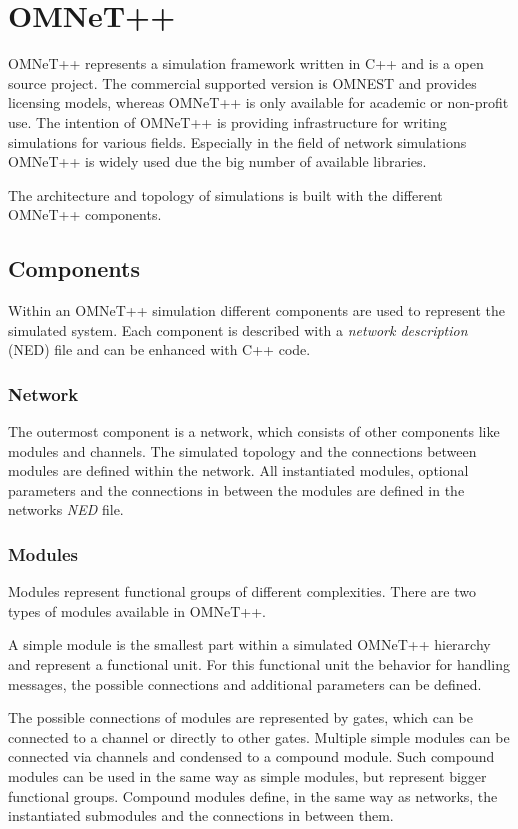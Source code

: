 \chapter{OMNeT++}

\label{sec:OMNeT}
OMNeT++ represents a simulation framework written in C++ and is a open source project.
The commercial supported version is OMNEST and provides licensing models, whereas OMNeT++ is only available for academic or non-profit use.
The intention of OMNeT++ is providing infrastructure for writing simulations for various fields.
Especially in the field of network simulations OMNeT++ is widely used due the big number of available libraries.

The architecture and topology of simulations is built with the different OMNeT++ components.

\section{Components}
Within an OMNeT++ simulation different components are used to represent the simulated system.
Each component is described with a \emph{network description} (NED) file and can be enhanced with C++ code.

\subsection{Network}
The outermost component is a network, which consists of other components like modules and channels.
The simulated topology and the connections between modules are defined within the network.
All instantiated modules, optional parameters and the connections in between the modules are defined in the networks \emph{NED} file.

\subsection{Modules}
Modules represent functional groups of different complexities.
There are two types of modules available in OMNeT++.

A simple module is the smallest part within a simulated OMNeT++ hierarchy and represent a functional unit.
For this functional unit the behavior for handling messages, the possible connections and additional parameters can be defined.

The possible connections of modules are represented by gates, which can be connected to a channel or directly to other gates.
Multiple simple modules can be connected via channels and condensed to a compound module.
Such compound modules can be used in the same way as simple modules, but represent bigger functional groups.
Compound modules define, in the same way as networks, the instantiated submodules and the connections in between them.
\\

